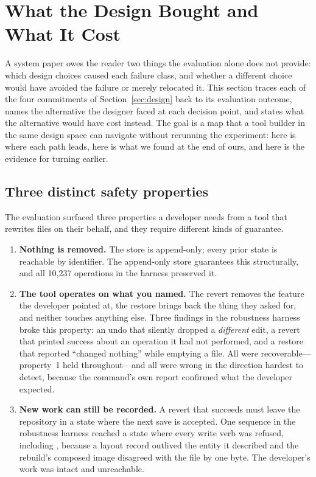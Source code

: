 \section{What the Design Bought and What It Cost}
\label{sec:discussion-synthesis}

A system paper owes the reader two things the evaluation alone does not provide:
which design choices caused each failure class, and whether a different choice
would have avoided the failure or merely relocated it. This section traces each
of the four commitments of Section~\ref{sec:design} back to its evaluation
outcome, names the alternative the designer faced at each decision point, and
states what the alternative would have cost instead. The goal is a map that a tool
builder in the same design space can navigate without rerunning the experiment:
here is where each path leads, here is what we found at the end of ours, and here
is the evidence for turning earlier.

\subsection{Three distinct safety properties}

The evaluation surfaced three properties a developer needs from a tool that
rewrites files on their behalf, and they require different kinds of guarantee.

\begin{enumerate}
\item \textbf{Nothing is removed.} The store is append-only; every prior state
  is reachable by identifier. The append-only store guarantees this
  structurally, and all 10{,}237 operations in the harness preserved it.
\item \textbf{The tool operates on what you named.} The revert removes the
  feature the developer pointed at, the restore brings back the thing they
  asked for, and neither touches anything else. Three findings in the
  robustness harness broke this property: an undo that silently dropped a
  \emph{different} edit, a revert that printed success about an operation it
  had not performed, and a restore that reported ``changed nothing'' while
  emptying a file. All were recoverable---property~1 held throughout---and
  all were wrong in the direction hardest to detect, because the command's own
  report confirmed what the developer expected.
\item \textbf{New work can still be recorded.} A revert that succeeds must
  leave the repository in a state where the next save is accepted. One
  sequence in the robustness harness reached a state where every write verb
  was refused, including , because a layout record outlived the
  entity it described and the rebuild's composed image disagreed with the
  file by one byte. The developer's work was intact and unreachable.
\end{enumerate}

